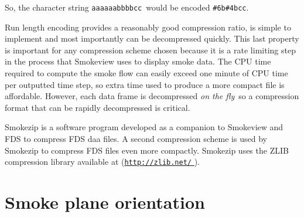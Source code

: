 \documentclass[11pt,twoside]{book}
\newcommand{\hhref}[1]{\href{#1}{{\tt #1}
}}
\begin{document}
So, the character string {\tt aaaaaabbbbcc}\ would be encoded {\tt \#6b\#4bcc}.

Run length encoding provides a reasonably good compression ratio, is simple to implement and most importantly can be decompressed quickly.
This last property is important for any compression scheme chosen because it is a rate limiting step in the process that Smokeview uses to display smoke data.
The CPU time required to compute the
smoke flow can easily exceed one minute of CPU time per outputted
time step, so extra time used to produce a more compact file is
affordable. However, each data frame is decompressed {\em on the
fly}\ so a compression format that can be rapidly decompressed is
critical.

Smokezip is a software program developed as a companion to Smokeview and FDS to compress FDS daa files.
A second compression scheme is used by Smokezip to compress FDS files even more compactly.  Smokezip uses the ZLIB compression library available at (\hhref{http://zlib.net/}).

\chapter{Smoke plane orientation}
\end{document}
